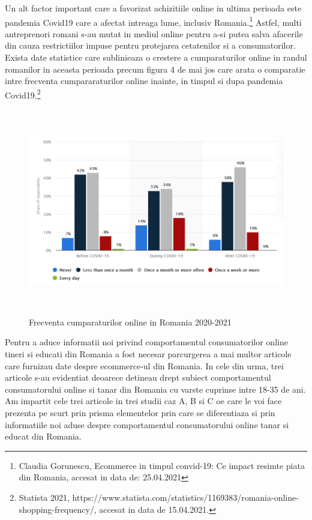 \documentclass[a4paper, 12pt]{article}
\begin{document}
	\quad Un alt factor important care a favorizat achizitiile online in ultima perioada este pandemia Covid19 care a afectat intreaga lume, inclusiv Romania.\footnote{Claudia Gorunescu, Ecommerce in timpul convid-19: Ce impact resimte piata din Romania, accesat in data de: 25.04.2021} Astfel, multi antreprenori romani s-au mutat in mediul online pentru a-si putea salva afacerile din cauza restrictiilor impuse pentru protejarea cetatenilor si a consumatorilor.
	 Exista date statistice care sublinieaza o crestere a cumparaturilor online in randul romanilor in aceasta perioada precum figura 4 de mai jos care arata o comparatie intre frecventa cumpararaturilor online inainte, in timpul si dupa pandemia Covid19.\footnote{Statista 2021, https://www.statista.com/statistics/1169383/romania-online-shopping-frequency/, accesat in data de 15.04.2021.}
	 	\begin{figure}[!htb]
	 	\centering
	 	\includegraphics[width=13cm, height=9cm]{"figures/fourth.png"}
	 	\caption{ Frecventa cumparaturilor online in Romania 2020-2021}\label{fig:fourth}
		 \end{figure}
 
 \qquad Pentru a aduce informatii noi privind comportamentul consumatorilor online tineri si educati din Romania a fost necesar parcurgerea a mai multor articole care furnizau date despre ecommerce-ul din Romania. In cele din urma, trei articole s-au evidentiat deoarece detineau drept subiect comportamentul consumatorului online si tanar din Romania cu varste cuprinse intre 18-35 de ani. Am impartit cele trei articole in trei studii caz A, B si C oe care le voi face prezenta pe scurt prin prisma elementelor prin care se diferentiaza si prin informatiile noi aduse despre comportamentul consumatorului online tanar si educat din Romania.
\end{document}

